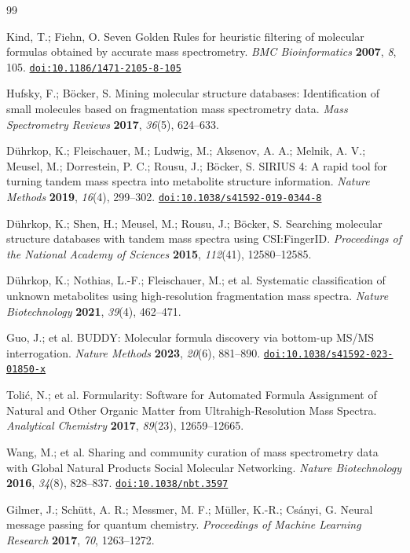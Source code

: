 \documentclass[journal=jcisd8]{achemso}
\providecommand*{\doi}[1]{\href{https://doi.org/#1}{\texttt{doi:#1}}}
\begin{document}
\begin{thebibliography}{99}

Kind, T.; Fiehn, O.
Seven Golden Rules for heuristic filtering of molecular formulas obtained by accurate mass spectrometry.
\textit{BMC Bioinformatics} \textbf{2007}, \textit{8}, 105.
\doi{10.1186/1471-2105-8-105}

Hufsky, F.; Böcker, S.
Mining molecular structure databases: Identification of small molecules based on fragmentation mass spectrometry data.
\textit{Mass Spectrometry Reviews} \textbf{2017}, \textit{36}(5), 624--633.

Dührkop, K.; Fleischauer, M.; Ludwig, M.; Aksenov, A. A.; Melnik, A. V.; Meusel, M.; Dorrestein, P. C.; Rousu, J.; Böcker, S.
SIRIUS 4: A rapid tool for turning tandem mass spectra into metabolite structure information.
\textit{Nature Methods} \textbf{2019}, \textit{16}(4), 299--302.
\doi{10.1038/s41592-019-0344-8}

Dührkop, K.; Shen, H.; Meusel, M.; Rousu, J.; Böcker, S.
Searching molecular structure databases with tandem mass spectra using CSI:FingerID.
\textit{Proceedings of the National Academy of Sciences} \textbf{2015}, \textit{112}(41), 12580--12585.

Dührkop, K.; Nothias, L.-F.; Fleischauer, M.; et al.
Systematic classification of unknown metabolites using high-resolution fragmentation mass spectra.
\textit{Nature Biotechnology} \textbf{2021}, \textit{39}(4), 462--471.

Guo, J.; et al.
BUDDY: Molecular formula discovery via bottom-up MS/MS interrogation.
\textit{Nature Methods} \textbf{2023}, \textit{20}(6), 881--890.
\doi{10.1038/s41592-023-01850-x}

Tolić, N.; et al.
Formularity: Software for Automated Formula Assignment of Natural and Other Organic Matter from Ultrahigh-Resolution Mass Spectra.
\textit{Analytical Chemistry} \textbf{2017}, \textit{89}(23), 12659--12665.

Wang, M.; et al.
Sharing and community curation of mass spectrometry data with Global Natural Products Social Molecular Networking.
\textit{Nature Biotechnology} \textbf{2016}, \textit{34}(8), 828--837.
\doi{10.1038/nbt.3597}

Gilmer, J.; Schütt, A. R.; Messmer, M. F.; Müller, K.-R.; Csányi, G.
Neural message passing for quantum chemistry.
\textit{Proceedings of Machine Learning Research} \textbf{2017}, \textit{70}, 1263--1272.


\end{thebibliography}
\end{document}

